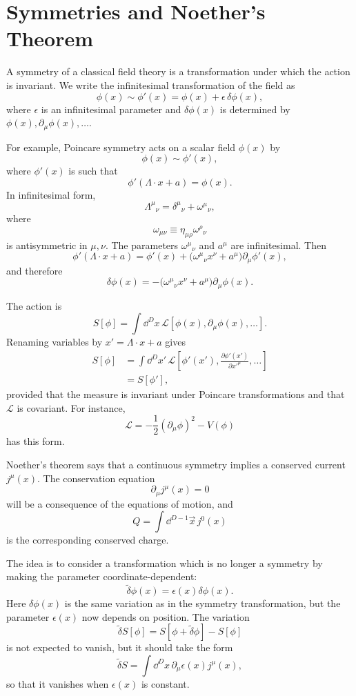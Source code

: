 \section{Symmetries and Noether's Theorem}

A symmetry of a classical field theory is a transformation under which the
action is invariant. We write the infinitesimal transformation of the field as
\[
  \phi(x)\sim \phi'(x)=\phi(x)+\epsilon\,\delta\phi(x),
\]
where \(\epsilon\) is an infinitesimal parameter and \(\delta\phi(x)\) is
determined by \(\phi(x),\partial_\mu\phi(x),\ldots\).

For example, Poincare symmetry acts on a scalar field \(\phi(x)\) by
\[
  \phi(x)\sim \phi'(x),
\]
where \(\phi'(x)\) is such that
\[
  \phi'(\Lambda\cdot x+a)=\phi(x).
\]
In infinitesimal form,
\[
  \Lambda^\mu{}_\nu=\delta^\mu{}_\nu+\omega^\mu{}_\nu,
\]
where
\[
  \omega_{\mu\nu}\equiv \eta_{\mu\rho}\omega^\rho{}_\nu
\]
is antisymmetric in \(\mu,\nu\). The parameters \(\omega^\mu{}_\nu\) and
\(a^\mu\) are infinitesimal. Then
\[
  \phi'(\Lambda\cdot x+a)
  =
  \phi'(x)+\bigl(\omega^\mu{}_\nu x^\nu+a^\mu\bigr)\partial_\mu\phi'(x),
\]
and therefore
\[
  \delta\phi(x)
  =
  -\bigl(\omega^\mu{}_\nu x^\nu+a^\mu\bigr)\partial_\mu\phi(x).
\]

The action is
\[
  S[\phi]
  =
  \int\dd^Dx\,
  \mathcal L[\phi(x),\partial_\mu\phi(x),\ldots].
\]
Renaming variables by \(x'=\Lambda\cdot x+a\) gives
\[
\begin{aligned}
  S[\phi]
  &=
  \int\dd^Dx'\,
  \mathcal L\left[
    \phi'(x'),
    \frac{\partial\phi'(x')}{\partial x'^\mu},
    \ldots
  \right] \\
  &=S[\phi'],
\end{aligned}
\]
provided that the measure is invariant under Poincare transformations and that
\(\mathcal L\) is covariant. For instance,
\[
  \mathcal L
  =
  -\frac12(\partial_\mu\phi)^2 - V(\phi)
\]
has this form.

Noether's theorem says that a continuous symmetry implies a conserved current
\(j^\mu(x)\). The conservation equation
\[
  \partial_\mu j^\mu(x)=0
\]
will be a consequence of the equations of motion, and
\[
  Q=\int\dd^{D-1}\vec x\,j^0(x)
\]
is the corresponding conserved charge.

The idea is to consider a transformation which is no longer a symmetry by
making the parameter coordinate-dependent:
\[
  \widetilde{\delta}\phi(x)=\epsilon(x)\delta\phi(x).
\]
Here \(\delta\phi(x)\) is the same variation as in the symmetry
transformation, but the parameter \(\epsilon(x)\) now depends on position. The
variation
\[
  \widetilde{\delta}S[\phi]
  =
  S[\phi+\widetilde{\delta}\phi]-S[\phi]
\]
is not expected to vanish, but it should take the form
\[
  \widetilde{\delta}S
  =
  \int\dd^Dx\,\partial_\mu\epsilon(x)j^\mu(x),
\]
so that it vanishes when \(\epsilon(x)\) is constant.


